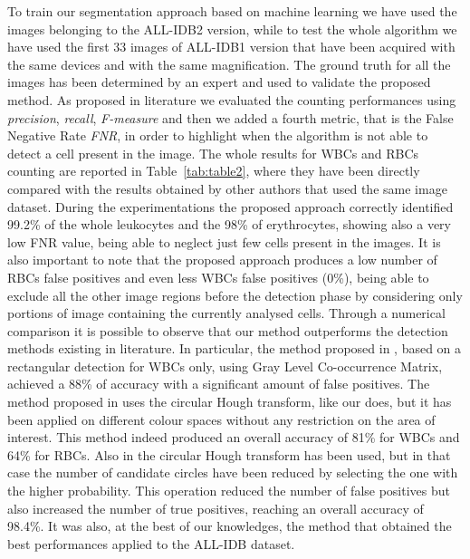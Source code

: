 \documentclass[final,a4paper,12pt,english]{UnicaPhdThesis3}
\begin{document}
To train our segmentation approach based on machine learning we have used the images belonging to the ALL-IDB2 version, while to test the whole algorithm we have used the first 33 images of ALL-IDB1 version that have been acquired with the same devices and with the same magnification. The ground truth for all the images has been determined by an expert and used to validate the proposed method. As proposed in literature we evaluated the counting performances using \textit{precision}, \textit{recall}, \textit{F-measure} and then we added a fourth metric, that is the False Negative Rate \textit{FNR}, in order to highlight when the algorithm is not able to detect a cell present in the image. The whole results for WBCs and RBCs counting are reported in Table~\ref{tab:table2}, where they have been directly compared with the results obtained by other authors that used the same image dataset.
During the experimentations the proposed approach correctly identified 99.2\% of the whole leukocytes and the 98\% of erythrocytes, showing also a very low FNR value, being able to neglect just few cells present in the images. It is also important to note that the proposed approach produces a low number of RBCs false positives and even less WBCs false positives (0\%), being able to exclude all the other image regions before the detection phase by considering only portions of image containing the currently analysed cells. Through a numerical comparison it is possible to observe that our method outperforms the detection methods existing in literature. In particular, the method proposed in \cite{Alilou}, based on a rectangular detection for WBCs only, using Gray Level Co-occurrence Matrix, achieved a 88\% of accuracy with a significant amount of false positives. The method proposed in \cite{Mahmood} uses the circular Hough transform, like our does, but it has been applied on different colour spaces without any restriction on the area of interest. This method indeed produced an overall accuracy of 81\% for WBCs and 64\% for RBCs. Also in \cite{Alomari} the circular Hough transform has been used, but in that case the number of candidate circles have been reduced by selecting the one with the higher probability. This operation reduced the number of false positives but also increased the number of true positives, reaching an overall accuracy of 98.4\%. It was also, at the best of our knowledges, the method that obtained the best performances applied to the ALL-IDB dataset. 
\end{document}
